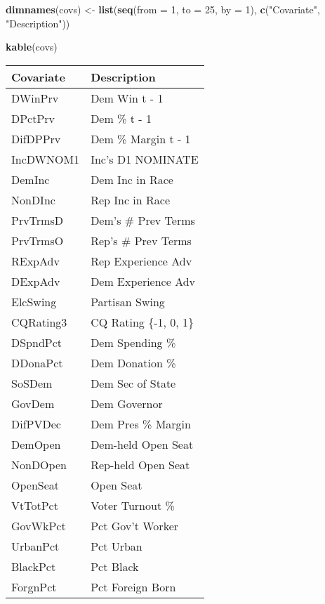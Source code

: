 \documentclass[
  12pt,
  leqno]{article}
\newenvironment{Shaded}{\begin{snugshade}}{\end{snugshade}}
\newcommand{\AttributeTok}[1]{\textcolor[rgb]{0.13,0.29,0.53}{#1}}
\newcommand{\DecValTok}[1]{\textcolor[rgb]{0.00,0.00,0.81}{#1}}
\newcommand{\FunctionTok}[1]{\textcolor[rgb]{0.13,0.29,0.53}{\textbf{#1}}}
\newcommand{\NormalTok}[1]{#1}
\newcommand{\OtherTok}[1]{\textcolor[rgb]{0.56,0.35,0.01}{#1}}
\newcommand{\StringTok}[1]{\textcolor[rgb]{0.31,0.60,0.02}{#1}}
\begin{document}
\begin{Shaded}
\begin{Highlighting}[]
\FunctionTok{dimnames}\NormalTok{(covs) }\OtherTok{\textless{}{-}} \FunctionTok{list}\NormalTok{(}\FunctionTok{seq}\NormalTok{(}\AttributeTok{from =} \DecValTok{1}\NormalTok{,}
                           \AttributeTok{to =} \DecValTok{25}\NormalTok{,}
                           \AttributeTok{by =} \DecValTok{1}\NormalTok{),}
                       \FunctionTok{c}\NormalTok{(}\StringTok{"Covariate"}\NormalTok{, }\StringTok{"Description"}\NormalTok{))}

\FunctionTok{kable}\NormalTok{(covs)}
\end{Highlighting}
\end{Shaded}

\begin{longtable}[]{@{}ll@{}}
\toprule\noalign{}
Covariate & Description \\
\midrule\noalign{}
\endhead
\bottomrule\noalign{}
\endlastfoot
DWinPrv & Dem Win t - 1 \\
DPctPrv & Dem \% t - 1 \\
DifDPPrv & Dem \% Margin t - 1 \\
IncDWNOM1 & Inc's D1 NOMINATE \\
DemInc & Dem Inc in Race \\
NonDInc & Rep Inc in Race \\
PrvTrmsD & Dem's \# Prev Terms \\
PrvTrmsO & Rep's \# Prev Terms \\
RExpAdv & Rep Experience Adv \\
DExpAdv & Dem Experience Adv \\
ElcSwing & Partisan Swing \\
CQRating3 & CQ Rating \{-1, 0, 1\} \\
DSpndPct & Dem Spending \% \\
DDonaPct & Dem Donation \% \\
SoSDem & Dem Sec of State \\
GovDem & Dem Governor \\
DifPVDec & Dem Pres \% Margin \\
DemOpen & Dem-held Open Seat \\
NonDOpen & Rep-held Open Seat \\
OpenSeat & Open Seat \\
VtTotPct & Voter Turnout \% \\
GovWkPct & Pct Gov't Worker \\
UrbanPct & Pct Urban \\
BlackPct & Pct Black \\
ForgnPct & Pct Foreign Born \\
\end{longtable}
\end{document}
